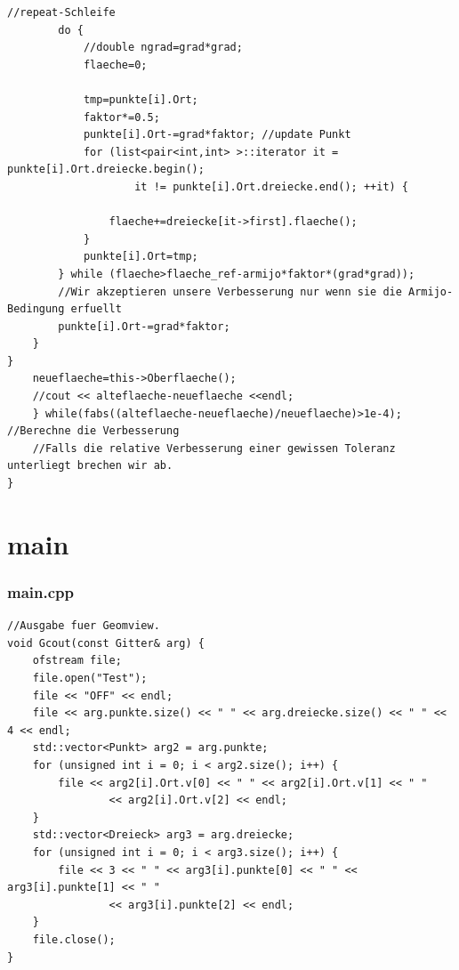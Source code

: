 \documentclass{beamer}
\begin{document}
\begin{frame}[fragile]
\begin{lstlisting}
//repeat-Schleife
		do {
			//double ngrad=grad*grad;
			flaeche=0;

			tmp=punkte[i].Ort;
			faktor*=0.5;
			punkte[i].Ort-=grad*faktor; //update Punkt
			for (list<pair<int,int> >::iterator it = punkte[i].Ort.dreiecke.begin();
					it != punkte[i].Ort.dreiecke.end(); ++it) {

				flaeche+=dreiecke[it->first].flaeche();
			}
			punkte[i].Ort=tmp;
		} while (flaeche>flaeche_ref-armijo*faktor*(grad*grad));
		//Wir akzeptieren unsere Verbesserung nur wenn sie die Armijo-Bedingung erfuellt
		punkte[i].Ort-=grad*faktor;
	}
}
	neueflaeche=this->Oberflaeche();
	//cout << alteflaeche-neueflaeche <<endl;
	} while(fabs((alteflaeche-neueflaeche)/neueflaeche)>1e-4); //Berechne die Verbesserung
	//Falls die relative Verbesserung einer gewissen Toleranz unterliegt brechen wir ab.
}
\end{lstlisting}
\end{frame}

\section{main}

\begin{frame}[fragile]

\frametitle{main.cpp}

\begin{lstlisting}
//Ausgabe fuer Geomview.
void Gcout(const Gitter& arg) {
	ofstream file;
	file.open("Test");
	file << "OFF" << endl;
	file << arg.punkte.size() << " " << arg.dreiecke.size() << " " << 4 << endl;
	std::vector<Punkt> arg2 = arg.punkte;
	for (unsigned int i = 0; i < arg2.size(); i++) {
		file << arg2[i].Ort.v[0] << " " << arg2[i].Ort.v[1] << " "
				<< arg2[i].Ort.v[2] << endl;
	}
	std::vector<Dreieck> arg3 = arg.dreiecke;
	for (unsigned int i = 0; i < arg3.size(); i++) {
		file << 3 << " " << arg3[i].punkte[0] << " " << arg3[i].punkte[1] << " "
				<< arg3[i].punkte[2] << endl;
	}
	file.close();
}
\end{lstlisting}
\end{frame}
\end{document}
